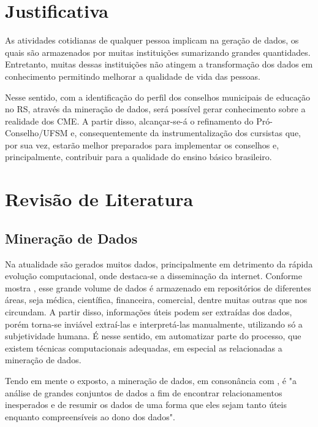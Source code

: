 \documentclass[projtg]{mdtufsm}
\begin{document}
\chapter{Justificativa}
As atividades cotidianas de qualquer pessoa implicam na geração de dados, os quais são armazenados por muitas instituições sumarizando grandes quantidades. Entretanto, muitas dessas instituições não atingem a transformação dos dados em conhecimento permitindo melhorar a qualidade de vida das pessoas. 

Nesse sentido, com a identificação do perfil dos conselhos municipais de educação no RS, através da mineração de dados, será possível gerar conhecimento sobre a realidade dos CME. A partir disso, alcançar-se-á o refinamento do Pró-Conselho/UFSM e, consequentemente da instrumentalização dos cursistas que, por sua vez, estarão melhor preparados para implementar os conselhos e, principalmente, contribuir para a qualidade do ensino básico brasileiro.   


\chapter{Revisão de Literatura}

\section{Mineração de Dados}

Na atualidade são gerados muitos dados, principalmente em detrimento da rápida evolução computacional, onde destaca-se a disseminação da internet. Conforme mostra \cite{enia5}, esse grande volume de dados é armazenado em repositórios de diferentes áreas, seja médica, científica, financeira, comercial, dentre muitas outras que nos circundam. A partir disso, informações úteis podem ser extraídas dos dados, porém torna-se inviável extraí-las e interpretá-las manualmente, utilizando só a subjetividade humana. É nesse sentido, em automatizar parte do processo, que existem técnicas computacionais adequadas, em especial as relacionadas a mineração de dados.

Tendo em mente o exposto, a mineração de dados, em consonância com \cite{hand}, é "a análise de grandes conjuntos de dados a fim de encontrar relacionamentos inesperados e de resumir os dados de uma forma que eles sejam tanto úteis enquanto compreensíveis ao dono dos dados".
\end{document}
